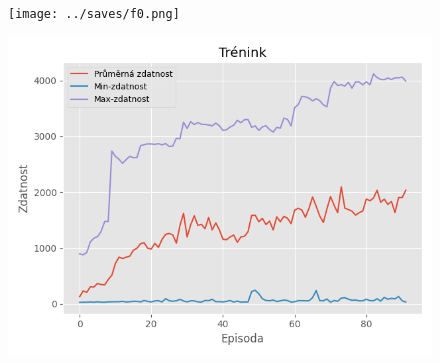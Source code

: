 \documentclass[a4paper,12pt]{article}
\begin{document}
            \begin{figure}[H]
            \centering
            \begin{minipage}[t]{.5\textwidth}
                \centering
                \texttt{[image: ../saves/f0.png]}
            \end{minipage}%
            \begin{minipage}[t]{.5\textwidth}
                \centering
                \includegraphics[width=1\linewidth]{../saves/f1.png}
            \end{minipage}
            \label{fig:results}
            \end{figure}
\end{document}
